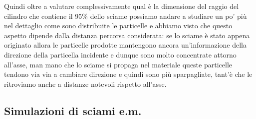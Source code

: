 Quindi oltre a valutare complessivamente qual è la dimensione del raggio del cilindro che contiene il 95\% dello sciame possiamo andare a studiare un po' più nel dettaglio come sono distribuite le particelle e abbiamo visto che questo aspetto dipende dalla distanza percorsa considerata: se lo sciame è stato appena originato allora le particelle prodotte mantengono ancora un'informazione della direzione della particella incidente e dunque sono molto concentrate attorno all'asse, man mano che lo sciame si propaga nel materiale queste particelle tendono via via a cambiare direzione e quindi sono più sparpagliate, tant'è che le ritroviamo anche a distanze notevoli rispetto all'asse.

\subsection{Simulazioni di sciami e.m.}

